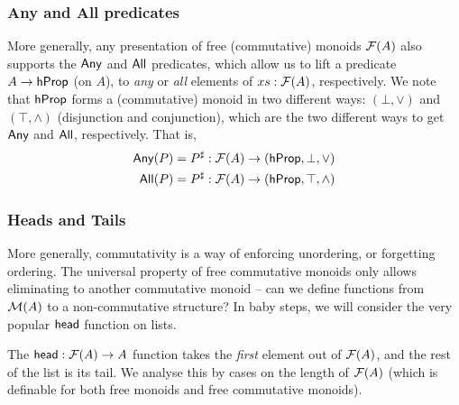 \subsubsection{Any and All predicates}

More generally, any presentation of free (commutative) monoids $\mathcal{F}(A)$ also supports the
$\operatorname{\mathsf{Any}}$ and $\operatorname{\mathsf{All}}$ predicates, which allow us to lift a predicate $A \to \mathsf{hProp}$ (on $A$),
to \emph{any} or \emph{all} elements of $xs : \mathcal{F}(A)$, respectively.
%
We note that $\mathsf{hProp}$ forms a (commutative) monoid in two different ways: $(\bot,\vee)$ and $(\top,\wedge)$
(disjunction and conjunction), which are the two different ways to get $\operatorname{\mathsf{Any}}$ and $\operatorname{\mathsf{All}}$, respectively.
That is,
\begin{align*}
    \mathsf{Any}(P) & = {P}^{\sharp} : \mathcal{F}(A) \to (\mathsf{hProp}, \bot, \vee)   \\
    \mathsf{All}(P) & = {P}^{\sharp} : \mathcal{F}(A) \to (\mathsf{hProp}, \top, \wedge)
\end{align*}

\subsubsection{Heads and Tails}\label{sec:head}

More generally, commutativity is a way of enforcing unordering, or forgetting ordering.
%
The universal property of free commutative monoids only allows eliminating to another commutative monoid --
can we define functions from $\mathcal{M}(A)$ to a non-commutative structure?
%
In baby steps, we will consider the very popular $\operatorname{\mathsf{head}}$ function on lists.

The $\operatorname{\mathsf{head}} : \mathcal{F}(A) \to A$ function takes the \emph{first} element out of $\mathcal{F}(A)$, and the rest of the list is
its tail.
%
We analyse this by cases on the length of $\mathcal{F}(A)$
(which is definable for both free monoids and free commutative monoids).

